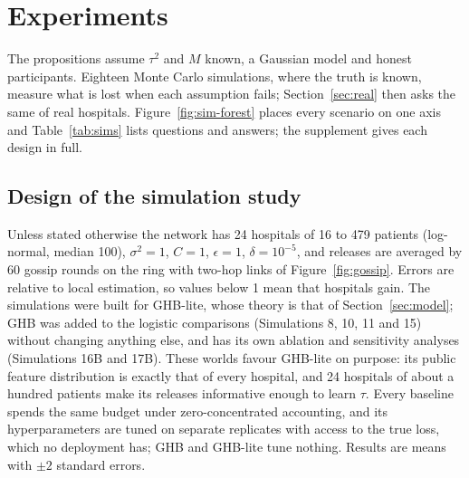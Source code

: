 \section{Experiments}\label{sec:experiments}

The propositions assume $\tau^2$ and $M$ known, a Gaussian model and honest participants. Eighteen Monte Carlo simulations, where the truth is known, measure what is lost when each assumption fails; Section~\ref{sec:real} then asks the same of real hospitals. Figure~\ref{fig:sim-forest} places every scenario on one axis and Table~\ref{tab:sims} lists questions and answers; the supplement gives each design in full.

\subsection{Design of the simulation study}\label{sec:sim-design}

Unless stated otherwise the network has 24 hospitals of 16 to 479 patients (log-normal, median 100), $\sigma^2=1$, $C=1$, $\epsilon=1$, $\delta=10^{-5}$, and releases are averaged by 60 gossip rounds on the ring with two-hop links of Figure~\ref{fig:gossip}. Errors are relative to local estimation, so values below 1 mean that hospitals gain. The simulations were built for GHB-lite, whose theory is that of Section~\ref{sec:model}; GHB was added to the logistic comparisons (Simulations 8, 10, 11 and 15) without changing anything else, and has its own ablation and sensitivity analyses (Simulations 16B and 17B). These worlds favour GHB-lite on purpose: its public feature distribution is exactly that of every hospital, and 24 hospitals of about a hundred patients make its releases informative enough to learn $\tau$. Every baseline spends the same budget under zero-concentrated accounting, and its hyperparameters are tuned on separate replicates with access to the true loss, which no deployment has; GHB and GHB-lite tune nothing. Results are means with $\pm2$ standard errors.

